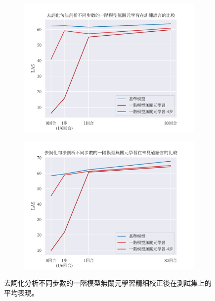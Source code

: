 \begin{figure}[!htbp]
    \centering
    \vspace{12pt}
    \begin{subfigure}[b]{0.8\textwidth}
        \centering
        \includegraphics[width=\textwidth]{figs/chapter3/delex/delex_fomaml_train_langs.pdf}
    \end{subfigure}
    \begin{subfigure}[b]{0.8\textwidth}
        \centering
        \includegraphics[width=\textwidth]{figs/chapter3/delex/delex_fomaml_test_langs.pdf}
    \end{subfigure}
    \caption{去詞化分析不同步數的一階模型無關元學習精細校正後在測試集上的平均表現。}
    \label{fig:delex_avg}
\end{figure}